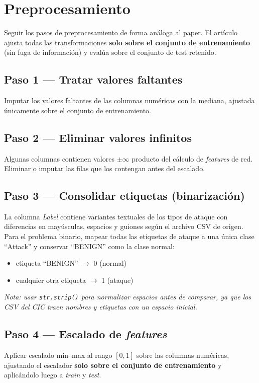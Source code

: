 \documentclass[11pt,a4paper]{article}
\newcommand{\codigo}[1]{\texttt{#1}}
\begin{document}
\section{Preprocesamiento}
Seguir los pasos de preprocesamiento de forma an\'aloga al paper. El art\'iculo ajusta todas las transformaciones \textbf{solo sobre el conjunto de entrenamiento} (sin fuga de informaci\'on) y eval\'ua sobre el conjunto de test retenido.

\subsection*{Paso 1 --- Tratar valores faltantes}
Imputar los valores faltantes de las columnas num\'ericas con la mediana, ajustada \'unicamente sobre el conjunto de entrenamiento.

\subsection*{Paso 2 --- Eliminar valores infinitos}
Algunas columnas contienen valores $\pm\infty$ producto del c\'alculo de \textit{features} de red. Eliminar o imputar las filas que los contengan antes del escalado.

\subsection*{Paso 3 --- Consolidar etiquetas (binarizaci\'on)}
La columna \textit{Label} contiene variantes textuales de los tipos de ataque con diferencias en may\'usculas, espacios y guiones seg\'un el archivo CSV de origen. Para el problema binario, mapear todas las etiquetas de ataque a una \'unica clase ``Attack'' y conservar ``BENIGN'' como la clase normal:
\begin{itemize}[leftmargin=2em,itemsep=2pt]
    \item etiqueta ``BENIGN'' $\rightarrow$ 0 (normal)
    \item cualquier otra etiqueta $\rightarrow$ 1 (ataque)
\end{itemize}
\textit{Nota: usar \codigo{str.strip()} para normalizar espacios antes de comparar, ya que los CSV del CIC traen nombres y etiquetas con un espacio inicial.}

\subsection*{Paso 4 --- Escalado de \textit{features}}
Aplicar escalado min--max al rango $[0,1]$ sobre las columnas num\'ericas, ajustando el escalador \textbf{solo sobre el conjunto de entrenamiento} y aplic\'andolo luego a \textit{train} y \textit{test}.
\end{document}
